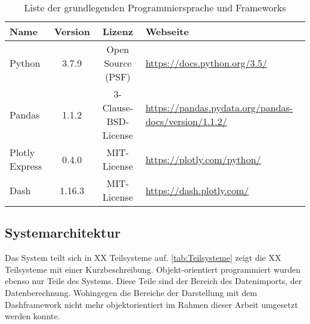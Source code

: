     \begingroup
        \setlength{\tabcolsep}{4pt} %
        \renewcommand{\arraystretch}{1.5}
        \begin{table}[h]
            \centering
            \begin{adjustbox}{max width=\textwidth}
            \Huge
            \begin{tabular}{lccl}
               \toprule
               \textbf{Name}             &{Version}    &\textbf{Lizenz}                        & \textbf{Webseite}\\
               \midrule     
                    Python               &3.7.9         &Open Source (PSF)                     & \url{https://docs.python.org/3.5/}\\
                    Pandas               &1.1.2         &3-Clause-BSD-License                  & \url{https://pandas.pydata.org/pandas-docs/version/1.1.2/}\\
                    Plotly Express       &0.4.0         &MIT-License                           & \url{https://plotly.com/python/}\\
                    Dash                 &1.16.3        &MIT-License                           & \url{https://dash.plotly.com/}\\


                \bottomrule
            \end{tabular}
            \end{adjustbox}
            \caption{%
                Liste der grundlegenden Programmiersprache und Frameworks
            \label{tab:Software-Requirements}
            }
             \end{table}
        \endgroup
    
     
    \subsection{Systemarchitektur}
    
    Das System teilt sich in XX Teilsysteme auf. \autoref{tab:Teilsysteme} zeigt die XX Teilsysteme mit einer Kurzbeschreibung.
    Objekt-orientiert programmiert wurden ebenso nur Teile des Systems. Diese Teile sind der Bereich des Datenimports, der Datenberechnung. Wohingegen die Bereiche der            
    Darstellung mit dem Dashframework nicht mehr objektorientiert im Rahmen dieser Arbeit umgesetzt werden konnte.
    
